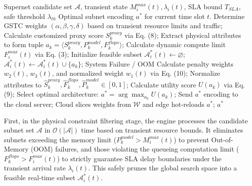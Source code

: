\documentclass[conference]{IEEEtran}
\begin{document}
\begin{algorithm}
\caption{Cloud-Edge Collaborative Dynamic Heuristic Scheduling}
\label{alg:scheduling}
\begin{algorithmic}[1]
\REQUIRE Supernet candidate set $\mathcal{A}$, transient state $M_{i}^{max}(t), \lambda_{i}(t)$, SLA bound $T_{SLA}$, safe threshold $\lambda_{th}$
\ENSURE Optimal subnet encoding $a^{*}$ for current time slot $t$.
\STATE Determine GSTC weights $(\alpha, \beta, \gamma, \delta)$ based on transient resource limits and traffic;
    \STATE Calculate customized proxy score $S_{k}^{proxy}$ via Eq. (8);
    \STATE Extract physical attributes to form tuple $a_{k}=\langle S_{k}^{proxy}, P_{k}^{model}, F_{k}^{flops}\rangle$;
\ENDFOR
\STATE Calculate dynamic compute limit $F_{i}^{max}(t)$ via Eq. (3);
\STATE Initialize feasible subset $\mathcal{A}_{i}^{*}(t) \leftarrow \varnothing$;
        \STATE $\mathcal{A}_{i}^{*}(t) \leftarrow \mathcal{A}_{i}^{*}(t) \cup \{a_{k}\}$;
    \ENDIF
\ENDFOR
{}
    \RETURN System Failure / OOM
\ENDIF
\STATE Calculate penalty weights $w_{2}(t)$, $w_{3}(t)$, and normalized weight $w_{1}(t)$ via Eq. (10);
    \STATE Normalize attributes to $\hat{S}_{k}^{proxy}, \hat{F}_{k}^{flops}, \hat{P}_{k}^{model} \in [0,1]$;
    \STATE Calculate utility score $U(a_{k})$ via Eq. (9);
\ENDFOR
\STATE Select optimal architecture: $a^{*} = \arg\max_{a_{k}} U(a_{k})$;
\STATE Send $a^{*}$ encoding to the cloud server;
\STATE Cloud slices weights from $\mathcal{W}$ and edge hot-reloads $a^{*}$;
\RETURN $a^{*}$
\end{algorithmic}
\end{algorithm}

First, in the physical constraint filtering stage, the engine processes the candidate subnet set $\mathcal{A}$ in $\mathcal{O}(|\mathcal{A}|)$ time based on transient resource bounds. It eliminates subnets exceeding the memory limit ($P_k^{model} > M_i^{max}(t)$) to prevent Out-of-Memory (OOM) failures, and those violating the queueing computation limit ($F_k^{flops} > F_i^{max}(t)$) to strictly guarantee SLA delay boundaries under the transient arrival rate $\lambda_i(t)$. This safely prunes the global search space into a feasible real-time subset $\mathcal{A}_i^*(t)$.
\end{document}
